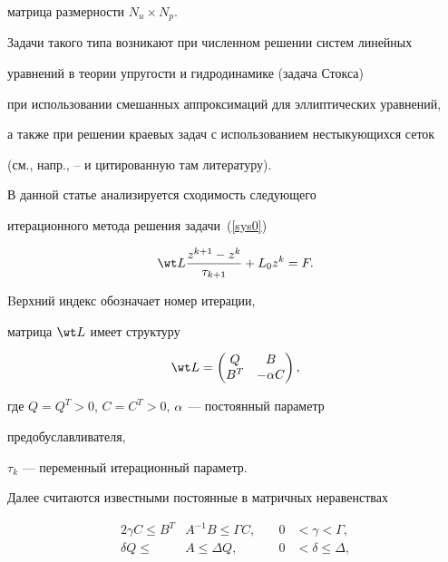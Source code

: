 матрица размерности $N_u \times N_p$.


Задачи такого типа возникают при численном решении систем линейных


уравнений в теории упругости и гидродинамике (задача Стокса)


при использовании смешанных аппроксимаций для эллиптических уравнений, 


а также при решении краевых задач с использованием нестыкующихся сеток


(см., напр., \cite{Diak1}--\cite{Vasil} и цитированную там литературу).





В данной статье анализируется сходимость следующего


итерационного метода решения задачи~(\ref{sys0})


\begin{equation}


\label{meth}


\wt L \frac{z^{k+1}-z^k}{\tau_{k+1}} + L_{0} z^k = F.


\end{equation}


Bерхний индекс обозначает номер итерации,


матрица $\wt L$ имеет структуру


$$


\wt L =


\begin{pmatrix}


Q & B \\ B^T & - \za C


\end{pmatrix}


,


$$


где $Q=Q^T>0$, $C=C^T > 0$, $\alpha $ --- постоянный параметр


предобуславливателя,


$\tau_k$ --- переменный итерационный параметр.


Далее считаются известными постоянные в матричных неравенствах


\begin{alignat*}{2}


\gamma C \leq B^T & A^{-1} B \leq \Gamma C, &\quad


0 &< \gamma < \Gamma, \\


%


\delta Q \leq & A \leq \Delta Q, &\quad 0 &< \delta \leq \Delta,


\end{alignat*}


